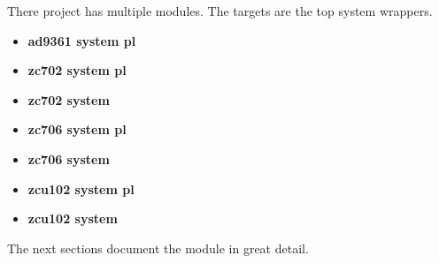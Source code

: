 \par
There project has multiple modules. The targets are the top system wrappers.

\begin{itemize}
\item \textbf{ad9361 system pl}
\item \textbf{zc702 system pl}
\item \textbf{zc702 system}
\item \textbf{zc706 system pl}
\item \textbf{zc706 system}
\item \textbf{zcu102 system pl}
\item \textbf{zcu102 system}
\end{itemize}
The next sections document the module in great detail.

